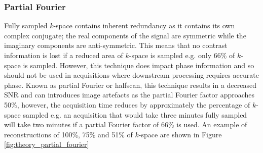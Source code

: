 \subsubsection{Partial Fourier}
\label{subsec:theory_partial_fourier}
Fully sampled $k$-space contains inherent redundancy as it contains its own complex conjugate; the real components of the signal are symmetric while the imaginary components are anti-symmetric. This means that no contrast information is lost if a reduced area of $k$-space is sampled e.g. only 66\% of $k$-space is sampled. However, this technique does impact phase information and so should not be used in acquisitions where downstream processing requires accurate phase. Known as partial Fourier or halfscan, this technique results in a decreased \ac{SNR} and can introduces image artefacts as the partial Fourier factor approaches 50\%, however, the acquisition time reduces by approximately the percentage of $k$-space sampled e.g. an acquisition that would take three minutes fully sampled will take two minutes if a partial Fourier factor of 66\% is used. An example of reconstructions of 100\%, 75\% and 51\% of $k$-space are shown in Figure \ref{fig:theory_partial_fourier}

